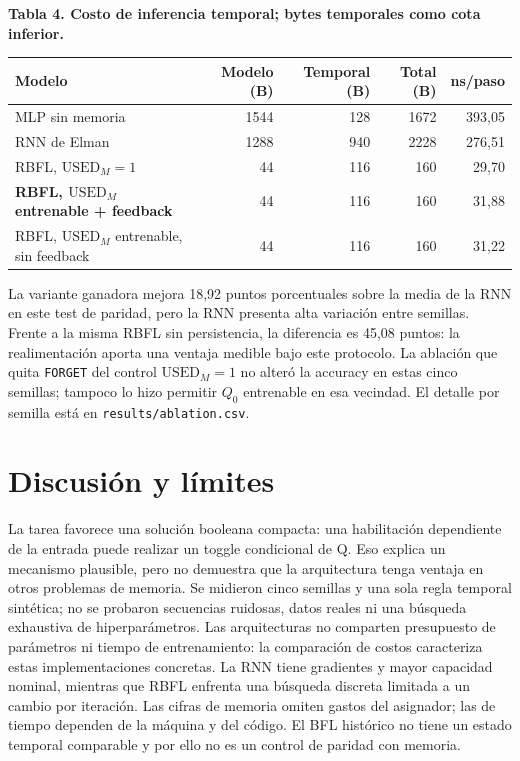\documentclass[10pt,a4paper]{article}
\newcommand{\UM}{\mathrm{USED}_{M}}
\newenvironment{fixedtable}[1]{\par\medskip\noindent\begin{minipage}{\linewidth}\centering\small\textbf{#1}\par\smallskip}{\end{minipage}\par\medskip}
\begin{document}
\begin{fixedtable}{Tabla 4. Costo de inferencia temporal; bytes temporales como cota inferior.}
\begin{tabular}{lrrrr}
\toprule
Modelo & Modelo (B) & Temporal (B) & Total (B) & ns/paso \\
\midrule
MLP sin memoria & 1544 & 128 & 1672 & 393,05 \\
RNN de Elman & 1288 & 940 & 2228 & 276,51 \\
RBFL, $\UM=1$ & 44 & 116 & 160 & 29,70 \\
\textbf{RBFL, $\UM$ entrenable + feedback} & 44 & 116 & 160 & 31,88 \\
RBFL, $\UM$ entrenable, sin feedback & 44 & 116 & 160 & 31,22 \\
\bottomrule
\end{tabular}
\end{fixedtable}

La variante ganadora mejora 18,92 puntos porcentuales sobre la media de la RNN en este test de paridad, pero la RNN presenta alta variación entre semillas. Frente a la misma RBFL sin persistencia, la diferencia es 45,08 puntos: la realimentación aporta una ventaja medible bajo este protocolo. La ablación que quita \texttt{FORGET} del control $\UM=1$ no alteró la accuracy en estas cinco semillas; tampoco lo hizo permitir $Q_0$ entrenable en esa vecindad. El detalle por semilla está en \texttt{results/ablation.csv}.

\section{Discusión y límites}
La tarea favorece una solución booleana compacta: una habilitación dependiente de la entrada puede realizar un toggle condicional de Q. Eso explica un mecanismo plausible, pero no demuestra que la arquitectura tenga ventaja en otros problemas de memoria. Se midieron cinco semillas y una sola regla temporal sintética; no se probaron secuencias ruidosas, datos reales ni una búsqueda exhaustiva de hiperparámetros. Las arquitecturas no comparten presupuesto de parámetros ni tiempo de entrenamiento: la comparación de costos caracteriza estas implementaciones concretas. La RNN tiene gradientes y mayor capacidad nominal, mientras que RBFL enfrenta una búsqueda discreta limitada a un cambio por iteración. Las cifras de memoria omiten gastos del asignador; las de tiempo dependen de la máquina y del código. El BFL histórico no tiene un estado temporal comparable y por ello no es un control de paridad con memoria.
\end{document}

